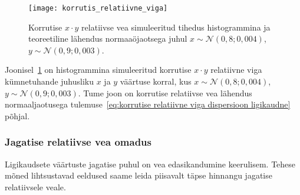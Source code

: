 \begin{figure}[H]
    \begin{center}
        \texttt{[image: korrutis\_relatiivne\_viga]}
    \end{center}
    \caption{Korrutise $x\cdot y$ relatiivse vea simuleeritud tihedus histogrammina ja teoreetiline lähendus normaaöjaotsega juhul $x\sim\mathcal{N}(0{,}8; 0{,}004)$, $y \sim \mathcal{N}(0{,}9; 0{,}003)$.}
    \label{fig:korrutis relatiivne viga tihedus}
\end{figure}

Joonisel~\ref{fig:korrutis relatiivne viga tihedus} on histogrammina simuleeritud korrutise $x \cdot y$ relatiivne viga kümnetuhande juhusliku $x$ ja $y$ väärtuse korral, kus $x \sim \mathcal{N}(0{,}8; 0{,}004)$, $y \sim \mathcal{N}(0{,}9; 0{,}003)$. Tume joon on korrutise relatiivse vea lähendus normaaljaotusega tulemuse~\eqref{eq:korrutise relatiivne viga dispersioon ligikaudne} põhjal.

\subsubsection{Jagatise relatiivse vea omadus}
Ligikaudsete väärtuste jagatise puhul on vea edasikandumine keerulisem. Tehese mõned lihtsustavad eeldused saame leida piisavalt täpse hinnangu jagatise relatiivsele veale.

